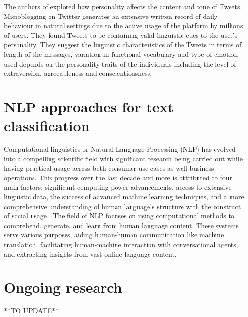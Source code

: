 The authors of \cite{qiuYouAreWhat2012} explored how personality affects the content and tone of Tweets. Microblogging on Twitter generates an extensive written record of daily behaviour in natural settings due to the active usage of the platform by millions of users. They found Tweets to be containing valid linguistic cues to the user's personality. They suggest the linguistic characteristics of the Tweets in terms of length of the messages, variation in functional vocabulary and type of emotion used depends on the personality traits of the individuals including the level of extraversion, agreeableness and conscientiousness.

\section{NLP approaches for text classification}
Computational linguistics or Natural Language Processing (NLP) has evolved into a compelling scientific field with significant research being carried out while having practical usage across both consumer use cases as well business operations. This progress over the last decade and more is attributed to four main factors: significant computing power advancements, access to extensive linguistic data, the success of advanced machine learning techniques, and a more comprehensive understanding of human language's structure with the construct of social usage \cite{hirschbergAdvancesNaturalLanguage2015}. The field of NLP focuses on using computational methods to comprehend, generate, and learn from human language content. These systems serve various purposes, aiding human-human communication like machine translation, facilitating human-machine interaction with conversational agents, and extracting insights from vast online language content.

\section{Ongoing research}
**TO UPDATE**